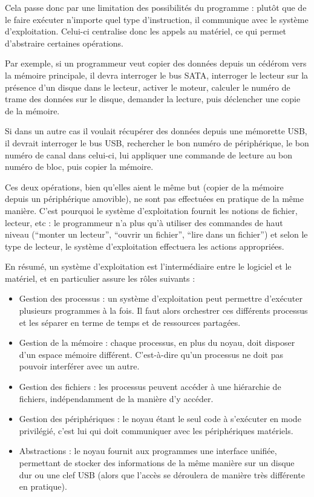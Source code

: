 Cela passe donc par une limitation des possibilités du programme : plutôt que de
le faire exécuter n'importe quel type d'instruction, il communique avec le
système d'exploitation. Celui-ci centralise donc les appels au matériel, ce qui
permet d'abstraire certaines opérations.

Par exemple, si un programmeur veut copier des données depuis un cédérom vers la
mémoire principale, il devra interroger le bus SATA, interroger le lecteur sur
la présence d'un disque dans le lecteur, activer le moteur, calculer le numéro
de trame des données sur le disque, demander la lecture, puis déclencher une
copie de la mémoire.

Si dans un autre cas il voulait récupérer des données depuis une mémorette USB,
il devrait interroger le bus USB, rechercher le bon numéro de périphérique, le
bon numéro de canal dans celui-ci, lui appliquer une commande de lecture au bon
numéro de bloc, puis copier la mémoire.

Ces deux opérations, bien qu'elles aient le même but (copier de la mémoire
depuis un périphérique amovible), ne sont pas effectuées en pratique de la même
manière. C'est pourquoi le système d'exploitation fournit les notions de
fichier, lecteur, etc : le programmeur n'a plus qu'à utiliser des commandes de
haut niveau (``monter un lecteur'', ``ouvrir un fichier'', ``lire dans un
fichier'') et selon le type de lecteur, le système d'exploitation effectuera les
actions appropriées.

En résumé, un système d'exploitation est l'intermédiaire entre le logiciel et
le matériel, et en particulier assure les rôles suivants :

\begin{itemize}
\item
  Gestion des processus : un système d'exploitation peut permettre
  d'exécuter plusieurs programmes à la fois. Il faut alors orchestrer
  ces différents processus et les séparer en terme de temps et de
  ressources partagées.
\item
  Gestion de la mémoire : chaque processus, en plus du noyau, doit
  disposer d'un espace mémoire différent. C'est-à-dire qu'un processus
  ne doit pas pouvoir interférer avec un autre.
\item
  Gestion des fichiers : les processus peuvent accéder à une hiérarchie de
  fichiers, indépendamment de la manière d'y accéder.
\item
  Gestion des périphériques : le noyau étant le seul code à s'exécuter
  en mode privilégié, c'est lui qui doit communiquer avec les
  périphériques matériels.
\item
  Abstractions : le noyau fournit aux programmes une interface unifiée,
  permettant de stocker des informations de la même manière sur un
  disque dur ou une clef USB (alors que l'accès se déroulera de manière
  très différente en pratique).
\end{itemize}

